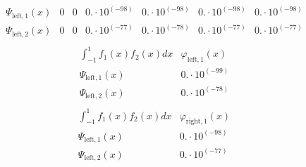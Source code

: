 \documentclass{article}
\begin{document}
\begin{landscape}
$$\begin{array}{l|llllll}
 \Psi_{\text{left},1}(x) & 0 & 0 & 0.\cdot 10^{(-98)} & 0.\cdot 10^{(-98)} & 0.\cdot 10^{(-98)} & 0.\cdot 10^{(-98)} \\ 
\Psi_{\text{left},2}(x) & 0 & 0 & 0.\cdot 10^{(-77)} & 0.\cdot 10^{(-78)} & 0.\cdot 10^{(-77)} & 0.\cdot 10^{(-77)} \\ 
\end{array} $$ 
$$ \begin{array}{l|l}
\int_{-1}^1 f_1(x)f_2(x) dx& \varphi_{\text{left},1}(x) \\ \hline 
 \Psi_{\text{left},1}(x) & 0.\cdot 10^{(-99)} \\ 
\Psi_{\text{left},2}(x) & 0.\cdot 10^{(-78)} \\ 
\end{array} $$ 
$$ \begin{array}{l|l}
\int_{-1}^1 f_1(x)f_2(x) dx& \varphi_{\text{right},1}(x) \\ \hline 
 \Psi_{\text{left},1}(x) & 0.\cdot 10^{(-98)} \\ 
\Psi_{\text{left},2}(x) & 0.\cdot 10^{(-77)} \\ 
\end{array} $$ 
\end{landscape}
\end{document}
